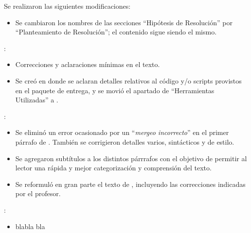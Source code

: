 \documentclass[11pt, a4paper, twoside]{article}
\begin{document}
{}

Se realizaron las siguientes modificaciones:

\begin{itemize}
\item Se cambiaron los nombres de las secciones ``Hipótesis de Resolución''
por ``Planteamiento de Resolución''; el contenido sigue siendo el mismo.
\end{itemize}

:
\begin{itemize}[leftmargin=+4em]
  \item Correcciones y aclaraciones mínimas en el texto.
    
    \item Se creó 
    en donde se aclaran detalles relativos al código 
    y/o scripts provistos en el paquete de entrega, 
    y se movió el apartado de ``Herramientas Utilizadas'' 
    a .
\end{itemize}

:
\begin{itemize}[leftmargin=+4em]

    \item Se eliminó un error ocasionado por un ``\textit{mergeo incorrecto}'' 
    en el primer párrafo de .
    También se corrigieron detalles varios, sintácticos y de estilo.
    
    \item Se agregaron subtítulos a los distintos párrrafos con el
    objetivo de permitir al lector una rápida y mejor
    categorización y comprensión del texto.
    
    \item Se reformuló en gran parte el texto de ,
    incluyendo las correcciones indicadas por el profesor.
    
\end{itemize}

:

\begin{itemize}[leftmargin=+4em]
    \item blabla
    bla
\end{itemize}

\end{document}
